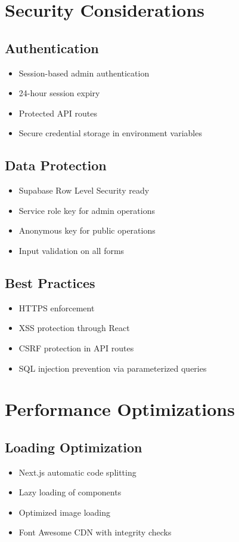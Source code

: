\documentclass[11pt,a4paper]{article}
\begin{document}
\section{Security Considerations}

\subsection{Authentication}
\begin{itemize}[leftmargin=*,itemsep=5pt]
    \item Session-based admin authentication
    \item 24-hour session expiry
    \item Protected API routes
    \item Secure credential storage in environment variables
\end{itemize}

\subsection{Data Protection}
\begin{itemize}[leftmargin=*,itemsep=5pt]
    \item Supabase Row Level Security ready
    \item Service role key for admin operations
    \item Anonymous key for public operations
    \item Input validation on all forms
\end{itemize}

\subsection{Best Practices}
\begin{itemize}[leftmargin=*,itemsep=5pt]
    \item HTTPS enforcement
    \item XSS protection through React
    \item CSRF protection in API routes
    \item SQL injection prevention via parameterized queries
\end{itemize}

\section{Performance Optimizations}

\subsection{Loading Optimization}
\begin{itemize}[leftmargin=*,itemsep=5pt]
    \item Next.js automatic code splitting
    \item Lazy loading of components
    \item Optimized image loading
    \item Font Awesome CDN with integrity checks
\end{itemize}
\end{document}
